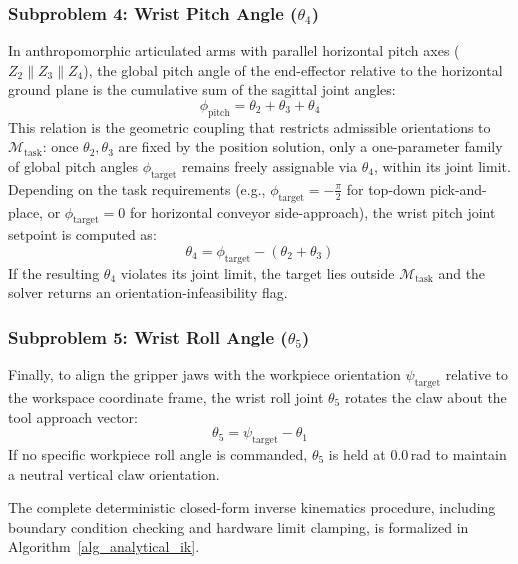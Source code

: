 \documentclass[journal]{IEEEtran}
\begin{document}
\subsubsection{Subproblem 4: Wrist Pitch Angle ($\theta_4$)}
In anthropomorphic articulated arms with parallel horizontal pitch axes ($Z_2 \parallel Z_3 \parallel Z_4$), the global pitch angle of the end-effector relative to the horizontal ground plane is the cumulative sum of the sagittal joint angles:
\begin{equation}
\phi_{\text{pitch}} = \theta_2 + \theta_3 + \theta_4
\end{equation}
This relation is the geometric coupling that restricts admissible orientations to $\mathcal{M}_{\text{task}}$: once $\theta_2,\theta_3$ are fixed by the position solution, only a one-parameter family of global pitch angles $\phi_{\text{target}}$ remains freely assignable via $\theta_4$, within its joint limit. Depending on the task requirements (e.g., $\phi_{\text{target}} = -\frac{\pi}{2}$ for top-down pick-and-place, or $\phi_{\text{target}} = 0$ for horizontal conveyor side-approach), the wrist pitch joint setpoint is computed as:
\begin{equation}
\theta_4 = \phi_{\text{target}} - (\theta_2 + \theta_3)
\end{equation}
If the resulting $\theta_4$ violates its joint limit, the target lies outside $\mathcal{M}_{\text{task}}$ and the solver returns an orientation-infeasibility flag.

\subsubsection{Subproblem 5: Wrist Roll Angle ($\theta_5$)}
Finally, to align the gripper jaws with the workpiece orientation $\psi_{\text{target}}$ relative to the workspace coordinate frame, the wrist roll joint $\theta_5$ rotates the claw about the tool approach vector:
\begin{equation}
\theta_5 = \psi_{\text{target}} - \theta_1
\end{equation}
If no specific workpiece roll angle is commanded, $\theta_5$ is held at $0.0$\,rad to maintain a neutral vertical claw orientation.

The complete deterministic closed-form inverse kinematics procedure, including boundary condition checking and hardware limit clamping, is formalized in Algorithm~\ref{alg_analytical_ik}.
\end{document}
